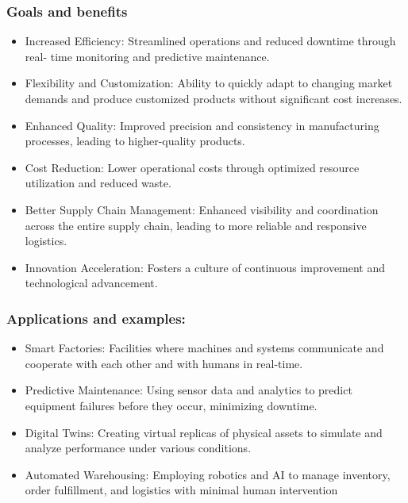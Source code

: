 \documentclass[12pt]{article}
\begin{document}
\subsubsection{Goals and benefits}
\begin{itemize}
    \item Increased Efficiency: Streamlined operations and reduced downtime through real-
    time monitoring and predictive maintenance.
    \item Flexibility and Customization: Ability to quickly adapt to changing market
    demands and produce customized products without significant cost increases.
    \item Enhanced Quality: Improved precision and consistency in manufacturing
    processes, leading to higher-quality products.
    \item Cost Reduction: Lower operational costs through optimized resource utilization
    and reduced waste.
    \item Better Supply Chain Management: Enhanced visibility and coordination across the
    entire supply chain, leading to more reliable and responsive logistics.
    \item Innovation Acceleration: Fosters a culture of continuous improvement and
    technological advancement.
\end{itemize}
\subsubsection{Applications and examples:}
\begin{itemize}
    \item Smart Factories: Facilities where machines and systems communicate and
    cooperate with each other and with humans in real-time.
    \item Predictive Maintenance: Using sensor data and analytics to predict
    equipment failures before they occur, minimizing downtime.
    \item Digital Twins: Creating virtual replicas of physical assets to simulate and
    analyze performance under various conditions.
    \item Automated Warehousing: Employing robotics and AI to manage inventory,
    order fulfillment, and logistics with minimal human intervention
\end{itemize}
\end{document}
